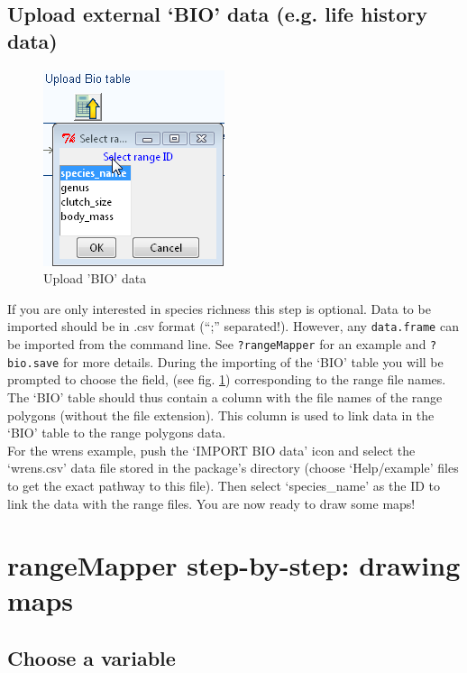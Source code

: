 \documentclass[ a4paper ]{article}
\begin{document}
	\subsection{ Upload external `BIO' data (e.g. life history data)}
	\begin{figure}[htbp]
	  \begin{center}
		\includegraphics[width=0.5\linewidth]{fig6}
		\caption{\label{fig:fig6} Upload 'BIO' data}
	  \end{center}
	\end{figure}
	
If you are only  interested in species richness this step is optional. Data to be imported should be in .csv format (``;'' separated!). However, any \texttt{data.frame} can be imported from the command line. See \texttt{?rangeMapper} for an example and \texttt{?bio.save} for more details. During the importing of the `BIO' table you will be prompted to choose  the field, (see fig. \ref{fig:fig6}) corresponding to the range file names. The `BIO' table should thus contain a column with the file names of the range polygons (without the file extension). This column is used to link data in the `BIO' table to the range polygons data.\\For the wrens example, push the `IMPORT BIO data' icon and select the `wrens.csv' data file stored in the package's directory (choose `Help/example' files to get the exact pathway to this file). Then select `species\_name' as the ID to link the data with the range files. You are now ready to draw some maps!

\section{rangeMapper step-by-step: drawing maps}		
	\subsection{ Choose a variable}
	
\end{document}
